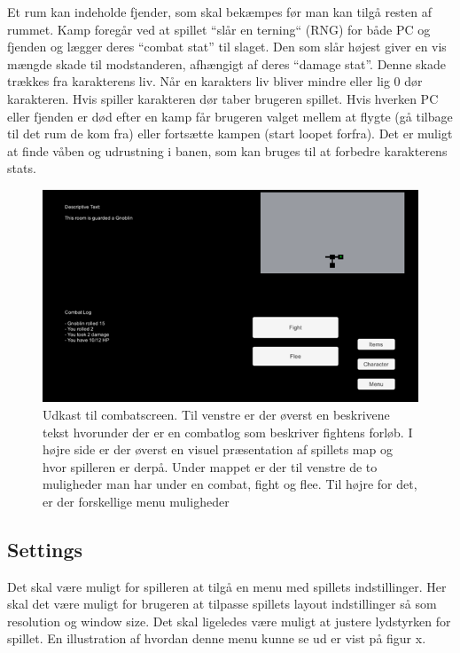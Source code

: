 Et rum kan indeholde fjender, som skal bekæmpes før man kan tilgå resten af rummet. Kamp foregår ved at spillet “slår en terning“ (RNG) for både PC og fjenden og lægger deres “combat stat” til slaget. Den som slår højest giver en vis mængde skade til modstanderen, afhængigt af deres “damage stat”. Denne skade trækkes fra karakterens liv. Når en karakters liv bliver mindre eller lig 0 dør karakteren. Hvis spiller karakteren dør taber brugeren spillet.  Hvis hverken PC eller fjenden er død efter en kamp får brugeren valget mellem at flygte (gå tilbage til det rum de kom fra) eller fortsætte kampen (start loopet forfra). 
Det er muligt at finde våben og udrustning i banen, som kan bruges til at forbedre karakterens stats. 

\begin{figure}[H]
\centering
\includegraphics[width = \textwidth]{02-Body/Images/CombatScreen-udkast.png}
\caption{Udkast til combatscreen. Til venstre er der øverst en beskrivene tekst hvorunder der er en combatlog som beskriver fightens forløb. I højre side er der øverst en visuel præsentation af spillets map og hvor spilleren er derpå. Under mappet er der til venstre de to muligheder man har under en combat, fight og flee. Til højre for det, er der forskellige menu muligheder}
\label{fig:Combat-udkast}
\end{figure}

\subsection{Settings}
Det skal være muligt for spilleren at tilgå en menu med spillets indstillinger. Her skal det være muligt for brugeren at tilpasse spillets layout indstillinger så som resolution og window size. Det skal ligeledes være muligt at justere lydstyrken for spillet. En illustration af hvordan denne menu kunne se ud er vist på figur x.

